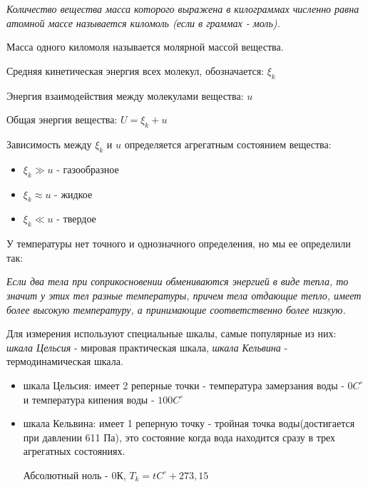  \textit{Количество вещества масса которого выражена в килограммах численно равна атомной массе называется киломоль (если в граммах - моль).}

 Масса одного киломоля называется молярной массой вещества.

\vspace{5px}

Средняя кинетическая энергия всех молекул, обозначается: $\xi_k$

\vspace{5px}

Энергия взаимодействия между молекулами вещества: $u$

\vspace{5px}

Общая энергия вещества: $U = \xi_k + u$

\newpage

Зависимость между $\xi_k$ и $u$ определяется агрегатным состоянием вещества:
\begin{itemize}
    \item $\xi_k \gg u$ - газообразное
    \item $\xi_k \approx u$ - жидкое
    \item $\xi_k \ll u$ - твердое
\end{itemize}
У температуры нет точного и однозначного определения, но мы ее определили так:

\vspace{5px}

 \textit{ Если два тела при соприкосновении обмениваются энергией в виде тепла, то значит у этих тел разные температуры, причем тела отдающие тепло, имеет более высокую температуру, а принимающие соответственно более низкую.}

\vspace{5px}

Для измерения используют специальные шкалы, самые популярные из них: \textit{шкала Цельсия}  - мировая практическая шкала, \textit{шкала Кельвина} - термодинамическая шкала.
\begin{itemize}
    \item шкала Цельсия: имеет 2 реперные точки - температура замерзания воды - $0 C^{\circ}$ и температура кипения воды - $100 C^{\circ}$
    \item шкала Кельвина: имеет 1 реперную точку - тройная точка воды(достигается при давлении 611 Па), это состояние когда вода находится сразу в трех агрегатных состояниях.

          Абсолютный ноль - 0К, $T_k = tC^{\circ} + 273,15$
\end{itemize}

